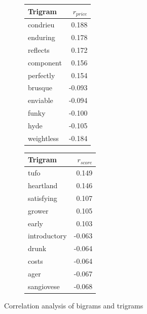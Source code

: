 \documentclass[12pt]{IEEEtran}
\begin{document}
\begin{figure}[b]
\begin{subfigure}{0.4\columnwidth}
\begin{tabular}{ |l|r| }
        \hline
        Trigram & $r_{price}$ \\
        \hline
        \hline
        condrieu & 0.188 \\
	    enduring & 0.178 \\ 
	    reflects & 0.172 \\
	    component & 0.156 \\
	    perfectly & 0.154 \\
        \hline
        brusque & -0.093 \\
        enviable & -0.094 \\
        funky & -0.100 \\
        hyde & -0.105 \\
        weightless & -0.184 \\
        \hline
    \end{tabular}
    \end{subfigure}
    \begin{subfigure}{0.4\columnwidth}
    \small
    \begin{tabular}{ |l|r| }
        \hline
        Trigram & $r_{score}$ \\
        \hline
        \hline
        tufo & 0.149 \\
        heartland & 0.146 \\
        satisfying & 0.107 \\
        grower & 0.105 \\
        early & 0.103 \\
        \hline
        introductory & -0.063 \\
        drunk & -0.064 \\
        costs & -0.064 \\
        ager & -0.067 \\
        sangiovese & -0.068 \\
        \hline
    \end{tabular}
    \end{subfigure}
    \caption{Correlation analysis of bigrams and trigrams}
    \label{correlation_cont}
\end{figure}
\end{document}
